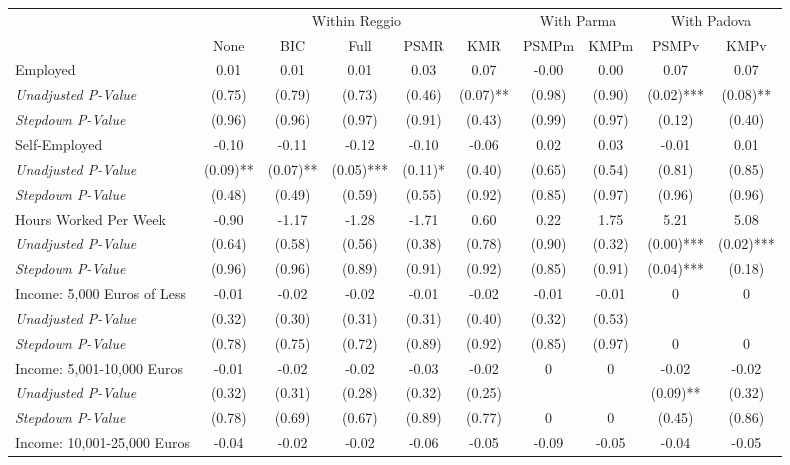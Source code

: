 \begin{tabular}{l c c c c c c c c c}
\toprule
& \multicolumn{5}{c}{Within Reggio} & \multicolumn{2}{c}{With Parma} & \multicolumn{2}{c}{With Padova} \\\cmidrule(lr){2-6} \cmidrule(lr){7-8} \cmidrule(lr){9-10}
 & None & BIC & Full & PSMR & KMR & PSMPm & KMPm & PSMPv & KMPv \\
\midrule
Employed & 0.01 & 0.01 & 0.01 & 0.03 & 0.07 & -0.00 & 0.00 & 0.07 & 0.07 \\
\quad \textit{Unadjusted P-Value} & (0.75) & (0.79) & (0.73) & (0.46) & (0.07)** & (0.98) & (0.90) & (0.02)*** & (0.08)** \\
\quad \textit{Stepdown P-Value} & (0.96) & (0.96) & (0.97) & (0.91) & (0.43) & (0.99) & (0.97) & (0.12) & (0.40) \\
Self-Employed & -0.10 & -0.11 & -0.12 & -0.10 & -0.06 & 0.02 & 0.03 & -0.01 & 0.01 \\
\quad \textit{Unadjusted P-Value} & (0.09)** & (0.07)** & (0.05)*** & (0.11)* & (0.40) & (0.65) & (0.54) & (0.81) & (0.85) \\
\quad \textit{Stepdown P-Value} & (0.48) & (0.49) & (0.59) & (0.55) & (0.92) & (0.85) & (0.97) & (0.96) & (0.96) \\
Hours Worked Per Week & -0.90 & -1.17 & -1.28 & -1.71 & 0.60 & 0.22 & 1.75 & 5.21 & 5.08 \\
\quad \textit{Unadjusted P-Value} & (0.64) & (0.58) & (0.56) & (0.38) & (0.78) & (0.90) & (0.32) & (0.00)*** & (0.02)*** \\
\quad \textit{Stepdown P-Value} & (0.96) & (0.96) & (0.89) & (0.91) & (0.92) & (0.85) & (0.91) & (0.04)*** & (0.18) \\
Income: 5,000 Euros of Less & -0.01 & -0.02 & -0.02 & -0.01 & -0.02 & -0.01 & -0.01 & 0 & 0 \\
\quad \textit{Unadjusted P-Value} & (0.32) & (0.30) & (0.31) & (0.31) & (0.40) & (0.32) & (0.53) & & \\
\quad \textit{Stepdown P-Value} & (0.78) & (0.75) & (0.72) & (0.89) & (0.92) & (0.85) & (0.97) & 0 & 0 \\
Income: 5,001-10,000 Euros & -0.01 & -0.02 & -0.02 & -0.03 & -0.02 & 0 & 0 & -0.02 & -0.02 \\
\quad \textit{Unadjusted P-Value} & (0.32) & (0.31) & (0.28) & (0.32) & (0.25) & & & (0.09)** & (0.32) \\
\quad \textit{Stepdown P-Value} & (0.78) & (0.69) & (0.67) & (0.89) & (0.77) & 0 & 0 & (0.45) & (0.86) \\
Income: 10,001-25,000 Euros & -0.04 & -0.02 & -0.02 & -0.06 & -0.05 & -0.09 & -0.05 & -0.04 & -0.05 \\

\end{tabular}
